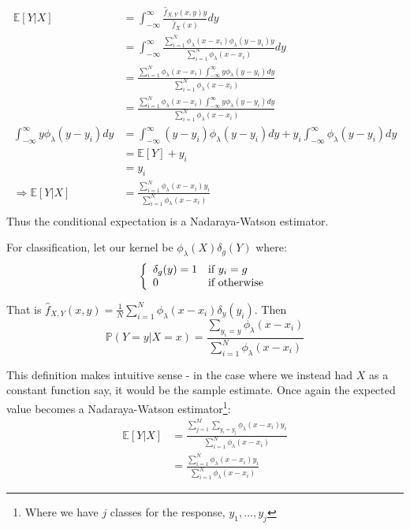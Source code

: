 \begin{align*}
    \mathbb{E}\left[Y\vert X\right] 
    &= \int_{-\infty}^\infty \frac{\hat{f}_{X,Y}(x,y) y}{\hat{f}_{X}(x)} dy \\
    &= \int_{-\infty}^\infty \frac{\sum_{i=1}^N \phi_\lambda(x-x_i)\phi_\lambda(y-y_i) y }{\sum_{i=1}^N \phi_\lambda(x-x_i)} dy  \\
    &= \frac{\sum_{i=1}^N \phi_\lambda(x-x_i)\int_{-\infty}^\infty y \phi_\lambda(y-y_i)  dy} {\sum_{i=1}^N  \phi_\lambda(x-x_i)}\\
    &= \frac{\sum_{i=1}^N \phi_\lambda(x-x_i)\int_{-\infty}^\infty y \phi_\lambda(y-y_i)  dy} {\sum_{i=1}^N  \phi_\lambda(x-x_i)}\\
    \int_{-\infty}^\infty y \phi_\lambda(y-y_i)  dy
    &= \int_{-\infty}^\infty (y-y_i) \phi_\lambda(y-y_i)  dy + y_i \int_{-\infty}^\infty  \phi_\lambda(y-y_i)  dy \\
    &=  \mathbb{E}\left[Y\right]  + y_i \\
    &= y_i \\
\Rightarrow  \mathbb{E}\left[Y\vert X\right] &=\frac{\sum_{i=1}^N \phi_\lambda(x-x_i) y_i} {\sum_{i=1}^N  \phi_\lambda(x-x_i)}\\
\end{align*}
Thus the conditional expectation is a Nadaraya-Watson estimator.

For classification, let our kernel be $\phi_\lambda(X)\delta_g(Y)$ where:
$$\left\{ \begin{array}{ll} \delta_g(y) = 1 & \mbox{if } y_i = g \\ 0 & \mbox{if } \text{otherwise} \end{array} \right.$$

That is $\hat{f}_{X, Y}(x,y) = \frac{1}{N} \sum_{i=1}^N \phi_\lambda(x-x_i) \delta_y(y_i)$. 
Then 
$$\mathbb{P}(Y=y|X=x) = \frac{\sum_{y_i=y} \phi_\lambda(x-x_i)} {\sum_{i=1}^N \phi_\lambda(x-x_i)}$$

This definition makes intuitive sense - in the case where we instead had $X$ as a constant function say, it would be the sample estimate. Once again the expected value becomes a Nadaraya-Watson estimator\footnote{Where we have $j$ classes for the response, $y_1, \dots, y_j$}:
\begin{align*}
    \mathbb{E}\left[Y\vert X\right] 
    &= \frac{\sum_{j = 1}^M \sum_{y_i=y_j} \phi_\lambda(x-x_i) y_i} {\sum_{i=1}^N \phi_\lambda(x-x_i)} \\
    &= \frac{\sum_{i = 1}^N \phi_\lambda(x-x_i) y_i} {\sum_{i=1}^N \phi_\lambda(x-x_i)} 
\end{align*}
